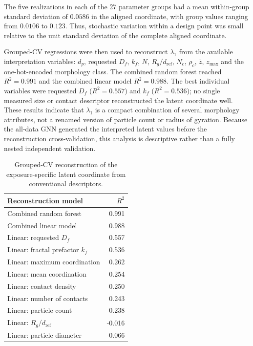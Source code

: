\documentclass[12pt,a4paper]{article}
\begin{document}
The five realizations in each of the 27 parameter groups had a mean within-group
standard deviation of $0.0586$ in the aligned coordinate, with group values
ranging from $0.0106$ to $0.123$. Thus, stochastic variation within a design
point was small relative to the unit standard deviation of the complete aligned
coordinate.

Grouped-CV regressions were then used to reconstruct $\lambda_1$ from the
available interpretation variables: $d_p$, requested $D_f$, $k_f$, $N$,
$R_g/d_{\mathrm{ref}}$, $N_c$, $\rho_c$, $\overline z$, $z_{\max}$ and the
one-hot-encoded morphology class. The combined random forest reached $R^2=0.991$ and the
combined linear model $R^2=0.988$. The best individual variables were requested
$D_f$ ($R^2=0.557$) and $k_f$ ($R^2=0.536$); no single measured size or contact
descriptor reconstructed the latent coordinate well. These results indicate
that $\lambda_1$ is a compact combination of several morphology attributes,
not a renamed version of particle count or radius of gyration. Because the
all-data GNN generated the interpreted latent values before the reconstruction
cross-validation, this analysis is descriptive rather than a fully nested
independent validation.

\begin{table}[!tbp]
	\centering
	\caption{Grouped-CV reconstruction of the exposure-specific latent
		coordinate from conventional descriptors.}
	\label{tab:latent_reconstruction}
	\begin{tabular}{lr}
		\toprule
		Reconstruction model & $R^2$ \\
		\midrule
		Combined random forest                  & 0.991 \\
		Combined linear model                   & 0.988 \\
		Linear: requested $D_f$                 & 0.557 \\
		Linear: fractal prefactor $k_f$         & 0.536 \\
		Linear: maximum coordination            & 0.262 \\
		Linear: mean coordination               & 0.254 \\
		Linear: contact density                 & 0.250 \\
		Linear: number of contacts              & 0.243 \\
		Linear: particle count                  & 0.238 \\
		Linear: $R_g/d_{\mathrm{ref}}$          & -0.016 \\
		Linear: particle diameter               & -0.066 \\
		\bottomrule
	\end{tabular}
\end{table}
\end{document}
